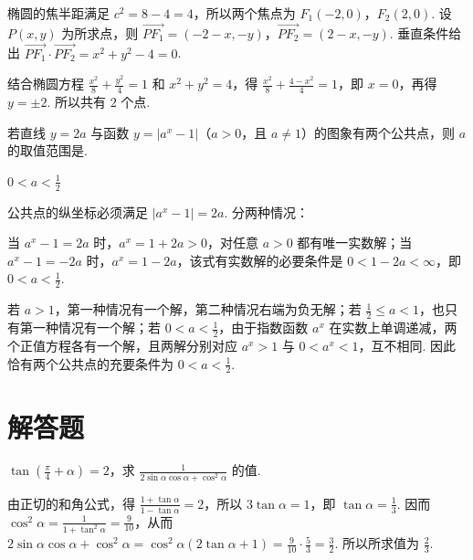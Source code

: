 \begin{solution}
椭圆的焦半距满足 \(c^2=8-4=4\)，所以两个焦点为 \(F_1(-2,0)\)，\(F_2(2,0)\). 设 \(P(x,y)\) 为所求点，则
\(\overrightarrow{PF_1}=( -2-x,-y)\)，\(\overrightarrow{PF_2}=(2-x,-y)\). 垂直条件给出
\(\overrightarrow{PF_1}\cdot\overrightarrow{PF_2}=x^2+y^2-4=0\).

结合椭圆方程 \(\frac{x^2}{8}+\frac{y^2}{4}=1\) 和 \(x^2+y^2=4\)，得
\(\frac{x^2}{8}+\frac{4-x^2}{4}=1\)，即 \(x=0\)，再得 \(y=\pm2\). 所以共有 \(2\) 个点.
\end{solution}

\begin{problem}
若直线 \(y = 2a\) 与函数 \(y = |a^{x} - 1|\)（\(a > 0\)，且 \(a \neq 1\)）的图象有两个公共点，则 \(a\) 的取值范围是\fillinblank{}.
\end{problem}

\begin{answer}
\(0<a<\frac{1}{2}\)
\end{answer}

\begin{solution}
公共点的纵坐标必须满足
\(\left|a^x-1\right|=2a\). 分两种情况：

当 \(a^x-1=2a\) 时，\(a^x=1+2a>0\)，对任意 \(a>0\) 都有唯一实数解；当 \(a^x-1=-2a\) 时，\(a^x=1-2a\)，该式有实数解的必要条件是 \(0<1-2a<\infty\)，即 \(0<a<\frac{1}{2}\).

若 \(a>1\)，第一种情况有一个解，第二种情况右端为负无解；若 \(\frac{1}{2}\leqslant a<1\)，也只有第一种情况有一个解；若 \(0<a<\frac{1}{2}\)，由于指数函数 \(a^x\) 在实数上单调递减，两个正值方程各有一个解，且两解分别对应 \(a^x>1\) 与 \(0<a^x<1\)，互不相同. 因此恰有两个公共点的充要条件为 \(0<a<\frac{1}{2}\).
\end{solution}

\section{解答题}
\begin{problem}
\(\tan \left(\frac{\pi}{4} + \alpha\right) = 2\)，求 \(\frac{1}{2\sin\alpha\cos\alpha + \cos^2\alpha}\) 的值.
\end{problem}

\begin{solution}
由正切的和角公式，得
\(\displaystyle\frac{1+\tan\alpha}{1-\tan\alpha}=2\)，所以 \(3\tan\alpha=1\)，即 \(\tan\alpha=\frac{1}{3}\). 因而 \(\cos^2\alpha=\frac{1}{1+\tan^2\alpha}=\frac{9}{10}\)，从而
\(2\sin\alpha\cos\alpha+\cos^2\alpha=\cos^2\alpha\left(2\tan\alpha+1\right)=\frac{9}{10}\cdot\frac{5}{3}=\frac{3}{2}\). 所以所求值为 \(\frac{2}{3}\).
\end{solution}

